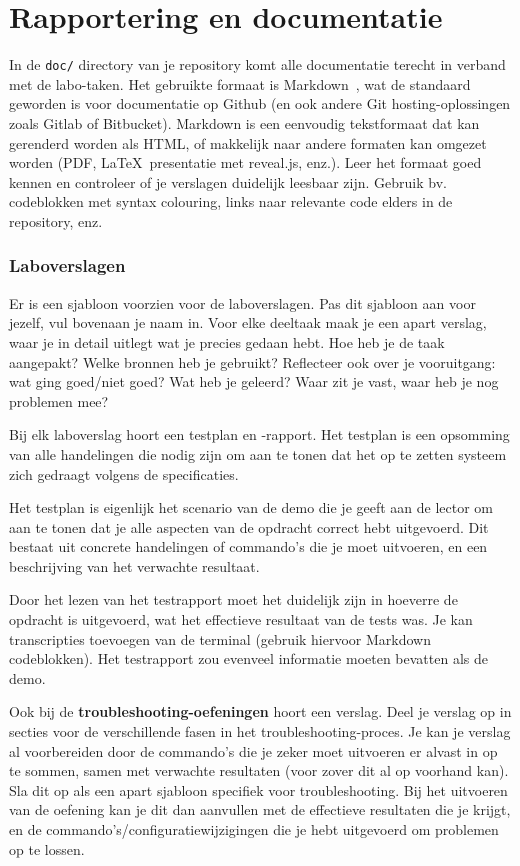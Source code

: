 \section{Rapportering en documentatie}
\label{rapportering-en-documentatie}

In de \texttt{doc/} directory van je repository komt alle documentatie terecht in verband met de labo-taken. Het gebruikte formaat is Markdown~\autocite{Gruber2004,Github2016}, wat de standaard geworden is voor documentatie op Github (en ook andere Git hosting-oplossingen zoals Gitlab of Bitbucket). Markdown is een eenvoudig tekstformaat dat kan gerenderd worden als HTML, of makkelijk naar andere formaten kan omgezet worden (PDF, \LaTeX\, presentatie met reveal.js, enz.). Leer het formaat goed kennen en controleer of je verslagen duidelijk leesbaar zijn. Gebruik bv. codeblokken met syntax colouring, links naar relevante code elders in de repository, enz.

\subsubsection{Laboverslagen}
\label{ssub:laboverslagen}

Er is een sjabloon voorzien voor de laboverslagen. Pas dit sjabloon aan voor jezelf, vul bovenaan je naam in. Voor elke deeltaak maak je een apart verslag, waar je in detail uitlegt wat je precies gedaan hebt. Hoe heb je de taak aangepakt? Welke bronnen heb je gebruikt? Reflecteer ook over je vooruitgang: wat ging goed/niet goed? Wat heb je geleerd? Waar zit je vast, waar heb je nog problemen mee?

Bij elk laboverslag hoort een testplan en -rapport. Het testplan is een opsomming van alle handelingen die nodig zijn om aan te tonen dat het op te zetten systeem zich gedraagt volgens de specificaties.

Het testplan is eigenlijk het scenario van de demo die je geeft aan de lector om aan te tonen dat je alle aspecten van de opdracht correct hebt uitgevoerd. Dit bestaat uit concrete handelingen of commando's die je moet uitvoeren, en een beschrijving van het verwachte resultaat.

Door het lezen van het testrapport moet het duidelijk zijn in hoeverre de opdracht is uitgevoerd, wat het effectieve resultaat van de tests was. Je kan transcripties toevoegen van de terminal (gebruik hiervoor Markdown codeblokken).  Het testrapport zou evenveel informatie moeten bevatten als de demo.

Ook bij de \textbf{troubleshooting-oefeningen} hoort een verslag. Deel je verslag op in secties voor de verschillende fasen in het troubleshooting-proces. Je kan je verslag al voorbereiden door de commando's die je zeker moet uitvoeren er alvast in op te sommen, samen met verwachte resultaten (voor zover dit al op voorhand kan). Sla dit op als een apart sjabloon specifiek voor troubleshooting. Bij het uitvoeren van de oefening kan je dit dan aanvullen met de effectieve resultaten die je krijgt, en de commando's/configuratiewijzigingen die je hebt uitgevoerd om problemen op te lossen.

